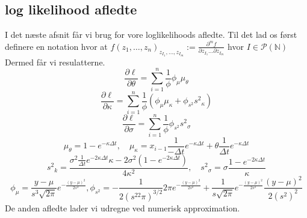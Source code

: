 \documentclass{article}
\theoremstyle{definition}
\theoremstyle{remark}
\begin{document}
\subsection{log likelihood afledte}
I det næste afsnit får vi brug for vore loglikelihoods afledte. Til det lad os først definere en notation hvor at $f(z_1,\hdots,z_n)_{z_{I_1},\hdots,z_{I_m}}:=\frac{\partial^m f}{\partial z_{I_1}\hdots\partial z_{I_m}}$ hvor $I\in \mathcal P(\mathbb N)$ Dermed får vi resulatterne.
$$\frac{\partial \ell}{\partial \theta}=\sum_{i=1}^n\frac{1}{\phi}\phi_\mu\mu_\theta$$
$$\frac{\partial \ell}{\partial \kappa}=\sum_{i=1}^n\frac1{\phi}(\phi_\mu\mu_\kappa+\phi_{s^2}{s^2}_\kappa)$$
$$\frac{\partial \ell}{\partial \sigma}=\sum_{i=1}^n\frac1{\phi}\phi_{s^2}{s^2}_\sigma$$
$$\mu_\theta = 1-e^{-\kappa\Delta t},\quad \mu_\kappa = x_{i-1}\frac{1}{-\Delta t}e^{-\kappa\Delta t}+\theta\frac{1}{\Delta t}e^{-\kappa\Delta t}$$
$${s^2}_k= \frac{\sigma^2\frac{1}{\Delta t}e^{-2\kappa\Delta t}\kappa-2\sigma^2(1-e^{-2\kappa\Delta t})}{4\kappa^2},\quad {s^2}_\sigma=\sigma\frac{1-e^{-2\kappa\Delta t}}{\kappa}$$
$$\phi_\mu=\frac{y-\mu}{s^3\sqrt{2\pi}}e^{-\frac{(y-\mu)^2}{2s^2}},\phi_{s^2}=-\frac{1}{2(s^22\pi)^{3/2}}2\pi e^{-\frac{(y-\mu)^2}{2s^2}}+\frac{1}{s\sqrt{2\pi}}e^{-\frac{(y-\mu)^2}{2s^2}}\frac{(y-\mu)^2}{2(s^2)^2}$$
De anden afledte lader vi udregne ved numerisk approximation.


\end{document}
